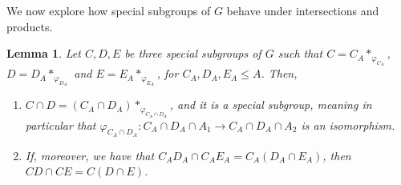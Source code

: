 \documentclass[11pt,letterpaper]{amsart}
\newtheorem{lemma}[prop]{Lemma}
\begin{document}
We now explore how special subgroups of $G$ behave under intersections and products.

\begin{lemma}\label{lem:HNNIntersection}
    Let $C,D,E$ be three special subgroups of $G$ such that $C=C_A*_{\varphi_{C_A}}$, $D=D_A*_{\varphi_{D_A}}$ and $E=E_A*_{\varphi_{E_A}}$, for $C_A,D_A,E_A\leq A$. Then,
    \begin{enumerate}
        \item $C \cap D = (C_A \cap D_A)*_{\varphi_{C_A\cap D_A}}$, and it is a special subgroup, meaning in particular that $\varphi_{C_A\cap D_A}: C_A\cap D_A\cap A_1 \to C_A \cap D_A\cap A_2$ is an isomorphism.
        \item If, moreover, we have that $C_AD_A \cap C_AE_A = C_A(D_A \cap E_A)$, then $C D \cap CE= C(D \cap E)$.
    \end{enumerate}
\end{lemma}
\end{document}
